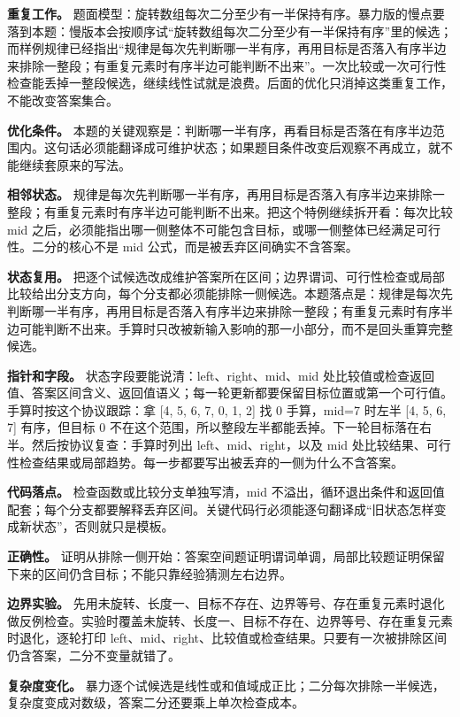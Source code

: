 \textbf{重复工作。} 题面模型：旋转数组每次二分至少有一半保持有序。暴力版的慢点要落到本题：慢版本会按顺序试“旋转数组每次二分至少有一半保持有序”里的候选；而样例规律已经指出“规律是每次先判断哪一半有序，再用目标是否落入有序半边来排除一整段；有重复元素时有序半边可能判断不出来”。一次比较或一次可行性检查能丢掉一整段候选，继续线性试就是浪费。后面的优化只消掉这类重复工作，不能改变答案集合。

\textbf{优化条件。} 本题的关键观察是：判断哪一半有序，再看目标是否落在有序半边范围内。这句话必须能翻译成可维护状态；如果题目条件改变后观察不再成立，就不能继续套原来的写法。

\textbf{相邻状态。} 规律是每次先判断哪一半有序，再用目标是否落入有序半边来排除一整段；有重复元素时有序半边可能判断不出来。把这个特例继续拆开看：每次比较 mid 之后，必须能指出哪一侧整体不可能包含目标，或哪一侧整体已经满足可行性。二分的核心不是 mid 公式，而是被丢弃区间确实不含答案。

\textbf{状态复用。} 把逐个试候选改成维护答案所在区间；边界谓词、可行性检查或局部比较给出分支方向，每个分支都必须能排除一侧候选。本题落点是：规律是每次先判断哪一半有序，再用目标是否落入有序半边来排除一整段；有重复元素时有序半边可能判断不出来。手算时只改被新输入影响的那一小部分，而不是回头重算完整候选。

\textbf{指针和字段。} 状态字段要能说清：left、right、mid、mid 处比较值或检查返回值、答案区间含义、返回值语义；每一轮更新都要保留目标位置或第一个可行值。手算时按这个协议跟踪：拿 [4, 5, 6, 7, 0, 1, 2] 找 0 手算，mid=7 时左半 [4, 5, 6, 7] 有序，但目标 0 不在这个范围，所以整段左半都能丢掉。下一轮目标落在右半。然后按协议复查：手算时列出 left、mid、right，以及 mid 处比较结果、可行性检查结果或局部趋势。每一步都要写出被丢弃的一侧为什么不含答案。

\textbf{代码落点。} 检查函数或比较分支单独写清，mid 不溢出，循环退出条件和返回值配套；每个分支都要解释丢弃区间。关键代码行必须能逐句翻译成“旧状态怎样变成新状态”，否则就只是模板。

\textbf{正确性。} 证明从排除一侧开始：答案空间题证明谓词单调，局部比较题证明保留下来的区间仍含目标；不能只靠经验猜测左右边界。

\textbf{边界实验。} 先用未旋转、长度一、目标不存在、边界等号、存在重复元素时退化做反例检查。实验时覆盖未旋转、长度一、目标不存在、边界等号、存在重复元素时退化，逐轮打印 left、mid、right、比较值或检查结果。只要有一次被排除区间仍含答案，二分不变量就错了。

\textbf{复杂度变化。} 暴力逐个试候选是线性或和值域成正比；二分每次排除一半候选，复杂度变成对数级，答案二分还要乘上单次检查成本。

